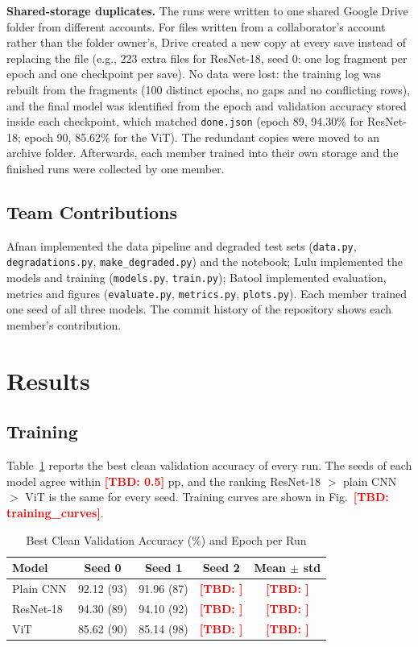 \documentclass[conference]{IEEEtran}
\newcommand{\tbd}[1]{\textcolor{red}{\textbf{[TBD: #1]}}}
\begin{document}
\textbf{Shared-storage duplicates.} The runs were written to one shared Google Drive folder from different accounts. For files written from a collaborator's account rather than the folder owner's, Drive created a new copy at every save instead of replacing the file (e.g., 223 extra files for ResNet-18, seed 0: one log fragment per epoch and one checkpoint per save). No data were lost: the training log was rebuilt from the fragments (100 distinct epochs, no gaps and no conflicting rows), and the final model was identified from the epoch and validation accuracy stored inside each checkpoint, which matched \texttt{done.json} (epoch 89, 94.30\% for ResNet-18; epoch 90, 85.62\% for the ViT). The redundant copies were moved to an archive folder. Afterwards, each member trained into their own storage and the finished runs were collected by one member.

\subsection{Team Contributions}
Afnan implemented the data pipeline and degraded test sets (\texttt{data.py}, \texttt{degradations.py}, \texttt{make\_degraded.py}) and the notebook; Lulu implemented the models and training (\texttt{models.py}, \texttt{train.py}); Batool implemented evaluation, metrics and figures (\texttt{evaluate.py}, \texttt{metrics.py}, \texttt{plots.py}). Each member trained one seed of all three models. The commit history of the repository shows each member's contribution.

\section{Results}

\subsection{Training}
Table~\ref{tab:train} reports the best clean validation accuracy of every run. The seeds of each model agree within \tbd{0.5} pp, and the ranking ResNet-18 $>$ plain CNN $>$ ViT is the same for every seed. Training curves are shown in Fig.~\tbd{training\_curves}.

\begin{table}[!t]
\caption{Best Clean Validation Accuracy (\%) and Epoch per Run}
\label{tab:train}
\centering
\footnotesize
\renewcommand{\arraystretch}{1.1}
\begin{tabular}{@{}lcccc@{}}
\toprule
\textbf{Model} & \textbf{Seed 0} & \textbf{Seed 1} & \textbf{Seed 2} & \textbf{Mean $\pm$ std} \\
\midrule
Plain CNN & 92.12 (93) & 91.96 (87) & \tbd{} & \tbd{} \\
ResNet-18 & 94.30 (89) & 94.10 (92) & \tbd{} & \tbd{} \\
ViT       & 85.62 (90) & 85.14 (98) & \tbd{} & \tbd{} \\
\bottomrule
\end{tabular}
\end{table}
\end{document}

